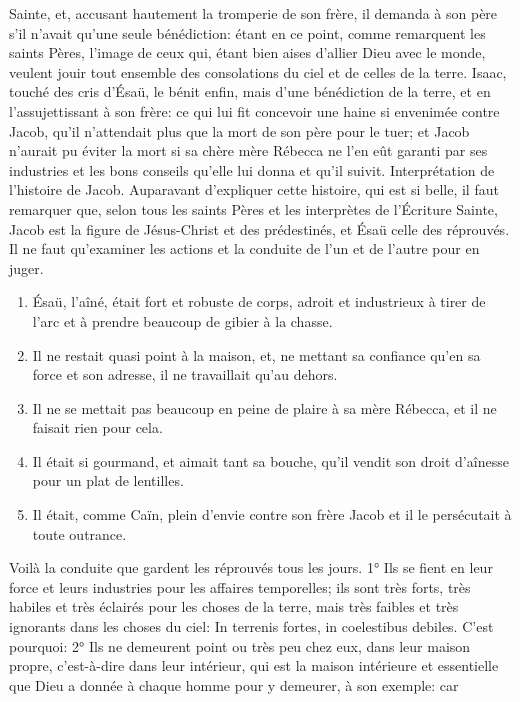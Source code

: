 Sainte, et, accusant hautement la tromperie de son frère, il demanda à son père s'il n'avait qu'une seule
bénédiction: étant en ce point, comme remarquent les saints Pères, l'image de ceux qui, étant bien aises d'allier
Dieu avec le monde, veulent jouir tout ensemble des consolations du ciel et de celles de la terre. Isaac, touché des
cris d'Ésaü, le bénit enfin, mais d'une bénédiction de la terre, et en l'assujettissant à son frère: ce qui lui fit
concevoir une haine si envenimée contre Jacob, qu'il n'attendait plus que la mort de son père pour le tuer; et Jacob
n'aurait pu éviter la mort si sa chère mère Rébecca ne l'en eût garanti par ses industries et les bons conseils
qu'elle lui donna et qu'il suivit.
Interprétation de l'histoire de Jacob.
 Auparavant d'expliquer cette histoire, qui est si belle, il faut remarquer que, selon tous les saints Pères et les
interprètes de l'Écriture Sainte, Jacob est la figure de Jésus-Christ et des prédestinés, et Ésaü celle des réprouvés.
Il ne faut qu'examiner les actions et la conduite de l'un et de l'autre pour en juger.
\begin{enumerate}[label=\arabic*°]
  \item Ésaü, l'aîné, était fort et robuste de corps, adroit et industrieux à tirer de l'arc et à prendre beaucoup de gibier à la chasse.
  \item Il ne restait quasi point à la maison, et, ne mettant sa confiance qu'en sa force et son adresse, il ne travaillait qu'au dehors.
  \item Il ne se mettait pas beaucoup en peine de plaire à sa mère Rébecca, et il ne faisait rien pour cela.
  \item Il était si gourmand, et aimait tant sa bouche, qu'il vendit son droit d'aînesse pour un plat de lentilles.
  \item Il était, comme Caïn, plein d'envie contre son frère Jacob et il le persécutait à toute outrance.
\end{enumerate}
 Voilà la conduite que gardent les réprouvés tous les jours.
1° Ils se fient en leur force et leurs industries pour les affaires temporelles; ils sont très forts, très habiles et très
éclairés pour les choses de la terre, mais très faibles et très ignorants dans les choses du ciel: In terrenis fortes, in
coelestibus debiles. C'est pourquoi:
 2° Ils ne demeurent point ou très peu chez eux, dans leur maison propre, c'est-à-dire dans leur intérieur, qui
est la maison intérieure et essentielle que Dieu a donnée à chaque homme pour y demeurer, à son exemple: car
